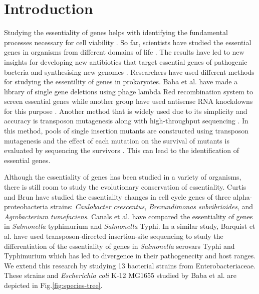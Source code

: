 \documentclass[12pt,letterpaper]{article}
\begin{document}
\section*{Introduction}
Studying the essentiality of genes helps with identifying the fundamental processes necessary for cell viability \cite{juhas_essence_2011}. So far, scientists have studied the essential genes in organisms from different domains of life \cite{luo_deg_2014}. The results have led to new insights for developing new antibiotics that target essential genes of pathogenic bacteria \cite{clatworthy_targeting_2007, peters_comprehensive_2016} and synthesising new genomes \cite{hutchison_global_1999, hutchison_design_2016}. Researchers have used different methods for studying the essentility of genes in prokaryotes. Baba et al.\@ \cite{baba_construction_2006} have made a library of single gene deletions using phage lambda Red recombination system to screen essential genes while another group have used antisense RNA knockdowns for this purpose \cite{xu_staphylococcus_2010}. Another method that is widely used due to its simplicity and accuracy is transposon mutagenesis along with high-throughput sequencing \cite{gawronski_tracking_2009, van_opijnen_tn-seq:_2009, langridge_simultaneous_2009, christen_essential_2011, goodman_identifying_2011, wetmore_rapid_2015, rubin_essential_2015}. In this method, pools of single insertion mutants are constructed using transposon mutagenesis and the effect of each mutation on the survival of mutants is evaluated by sequencing the survivors \cite{barquist_approaches_2013}. This can lead to the identification of essential genes.

Although the essentiality of genes has been studied in a variety of organisms, there is still room to study the evolutionary conservation of essentiality. Curtis and Brun \cite{curtis_identification_2014} have studied the essentiality changes in cell cycle genes of three alpha-proteobacteria strains: \textit{Caulobacter crescentus}, \textit{Brevundimonas subvibrioides}, and \textit{Agrobacterium tumefaciens}. Canals et al.\@ \cite{canals_high-throughput_2012} have compared the essentiality of genes in \textit{Salmonella} typhimurium and \textit{Salmonella} Typhi. In a similar study, Barquist et al.\@ \cite{barquist_comparison_2013} have used transposon-directed insertion-site sequencing to study the differentiation of the essentiality of genes in \textit{Salmonella} serovars Typhi and Typhimurium which has led to divergence in their pathogenecity and host ranges. We extend this research by studying 13 bacterial strains from Enterobacteriaceae. These strains and \textit{Escherichia coli} K-12 MG1655 studied by Baba et al.\@ \cite{baba_construction_2006} are depicted in Fig.\@ \ref{fig:species-tree}.
\end{document}
